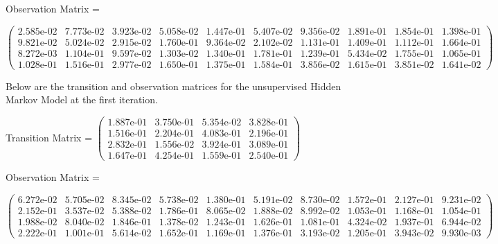Observation Matrix =

\small
$\begin{pmatrix}
2.585\text{e-}02 & 7.773\text{e-}02 & 3.923\text{e-}02 & 5.058\text{e-}02 & 1.447\text{e-}01 & 5.407\text{e-}02 & 9.356\text{e-}02 & 1.891\text{e-}01 & 1.854\text{e-}01 & 1.398\text{e-}01\\
9.821\text{e-}02 & 5.024\text{e-}02 & 2.915\text{e-}02 & 1.760\text{e-}01 & 9.364\text{e-}02 & 2.102\text{e-}02 & 1.131\text{e-}01 & 1.409\text{e-}01 & 1.112\text{e-}01 & 1.664\text{e-}01\\
8.272\text{e-}03 & 1.104\text{e-}01 & 9.597\text{e-}02 & 1.303\text{e-}02 & 1.340\text{e-}01 & 1.781\text{e-}01 & 1.239\text{e-}01 & 5.434\text{e-}02 & 1.755\text{e-}01 & 1.065\text{e-}01\\
1.028\text{e-}01 & 1.516\text{e-}01 & 2.977\text{e-}02 & 1.650\text{e-}01 & 1.375\text{e-}01 & 1.584\text{e-}01 & 3.856\text{e-}02 & 1.615\text{e-}01 & 3.851\text{e-}02 & 1.641\text{e-}02 
\end{pmatrix}$
\normalsize
\medskip

Below are the transition and observation matrices for the unsupervised Hidden Markov Model at the first iteration.

Transition Matrix = \small $\begin{pmatrix}
1.887\text{e-}01 & 3.750\text{e-}01 & 5.354\text{e-}02 & 3.828\text{e-}01\\
1.516\text{e-}01 & 2.204\text{e-}01 & 4.083\text{e-}01 & 2.196\text{e-}01\\
2.832\text{e-}01 & 1.556\text{e-}02 & 3.924\text{e-}01 & 3.089\text{e-}01\\
1.647\text{e-}01 & 4.254\text{e-}01 & 1.559\text{e-}01 & 2.540\text{e-}01   
\end{pmatrix}$
\normalsize

Observation Matrix =

\small
$\begin{pmatrix}
6.272\text{e-}02 & 5.705\text{e-}02 & 8.345\text{e-}02 & 5.738\text{e-}02 & 1.380\text{e-}01 & 5.191\text{e-}02 & 8.730\text{e-}02 & 1.572\text{e-}01 & 2.127\text{e-}01 & 9.231\text{e-}02\\
2.152\text{e-}01 & 3.537\text{e-}02 & 5.388\text{e-}02 & 1.786\text{e-}01 & 8.065\text{e-}02 & 1.888\text{e-}02 & 8.992\text{e-}02 & 1.053\text{e-}01 & 1.168\text{e-}01 & 1.054\text{e-}01\\
1.988\text{e-}02 & 8.040\text{e-}02 & 1.846\text{e-}01 & 1.378\text{e-}02 & 1.243\text{e-}01 & 1.626\text{e-}01 & 1.081\text{e-}01 & 4.324\text{e-}02 & 1.937\text{e-}01 & 6.944\text{e-}02\\
2.222\text{e-}01 & 1.001\text{e-}01 & 5.614\text{e-}02 & 1.652\text{e-}01 & 1.169\text{e-}01 & 1.376\text{e-}01 & 3.193\text{e-}02 & 1.205\text{e-}01 & 3.943\text{e-}02 & 9.930\text{e-}03 
\end{pmatrix}$
\normalsize
\medskip

